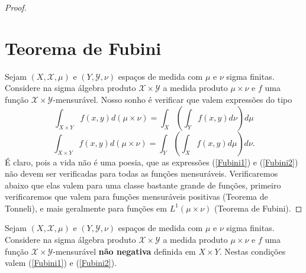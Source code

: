 \begin{proof}
\section{Teorema de Fubini}  
 Sejam $(X, \mathscr{X}, \mu)$ e $(Y, \mathscr{Y}, \nu)$
 espaços de medida com $\mu$ e $\nu$ sigma finitas. Considere na sigma álgebra
 produto $\mathscr{X}\times \mathscr{Y}$ a medida produto $\mu\times \nu$ e $f$ uma função $\mathscr{X}\times \mathscr{Y}$-mensurável. Nosso sonho 
 é verificar que valem expressões do tipo 
 \begin{equation}\label{Fubini1}
 \int_{X\times Y}f(x,y) d(\mu\times\nu)= \int_X(\int_Yf(x,y) d\nu)d\mu
 \end{equation}
 \begin{equation}\label{Fubini2}
 \int_{X\times Y}f(x,y) d(\mu\times \nu)=\int_Y(\int_Xf(x,y) d\mu)d\nu.
 \end{equation}
É claro, pois a vida não é uma poesia, que as expressões (\ref{Fubini1}) e (\ref{Fubini2}) não devem ser
verificadas para todas as funções mensuráveis. Verificaremos abaixo que elas valem para uma classe bastante 
grande de funções, primeiro verificaremos que valem para funções mensuráveis positivas (Teorema de Tonneli),
e mais geralmente para funções em $L^1(\mu\times \nu)$ (Teorema de Fubini).
\end{proof}



\begin{teorema}[Tonelli]\label{Tonelli}
Sejam $(X, \mathscr{X}, \mu)$ e $(Y, \mathscr{Y}, \nu)$
 espaços de medida com $\mu$ e $\nu$ sigma finitas. Considere na sigma álgebra
 produto $\mathscr{X}\times \mathscr{Y}$ a medida produto $\mu\times \nu$ e $f$ uma função $\mathscr{X}\times \mathscr{Y}$-mensurável \textbf{não negativa} definida em $X\times Y$. Nestas condições valem (\ref{Fubini1}) e (\ref{Fubini2}). 
\end{teorema}


